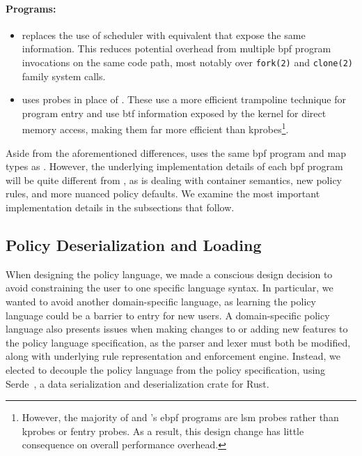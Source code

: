 \paragraph*{Programs:}
\begin{itemize}
  \item \bpfcontain{} replaces the use of scheduler \textbf{} with
  equivalent \textbf{} that expose the same information. This
  reduces potential overhead from multiple \gls{bpf} program invocations on the same code
  path, most notably over \texttt{fork(2)} and \texttt{clone(2)} family system calls.

  \item \bpfcontain{} uses \textbf{} probes in place of
  \textbf{}. These use a more efficient trampoline technique for program
  entry and use \gls{btf} information exposed by the kernel for direct memory access,
  making them far more efficient than kprobes\footnote{However, the majority of \bpfbox{} and
  \bpfcontain{}'s \gls{ebpf} programs are \gls{lsm} probes rather than kprobes or fentry
  probes. As a result, this design change has little consequence on overall performance overhead.}.
\end{itemize}

Aside from the aforementioned differences, \bpfcontain{} uses the same \gls{bpf} program
and map types as \bpfbox{}. However, the underlying implementation details of each
\gls{bpf} program will be quite different from \bpfbox{}, as \bpfcontain{} is dealing with
container semantics, new policy rules, and more nuanced policy defaults. We examine the
most important implementation details in the subsections that follow.



\subsection{Policy Deserialization and Loading}%
\label{ss:bpfcontain-serde}

When designing the \bpfcontain{} policy language, we made a conscious design decision to
avoid constraining the user to one specific language syntax. In particular, we wanted to
avoid another domain-specific language, as learning the policy language could be a barrier
to entry for new users. A domain-specific policy language also presents issues when making
changes to or adding new features to the policy language specification, as the parser and
lexer must both be modified, along with underlying rule representation and enforcement
engine. Instead, we elected to decouple the policy language from the policy specification,
using Serde~\cite{serde}, a data serialization and deserialization crate for Rust.

